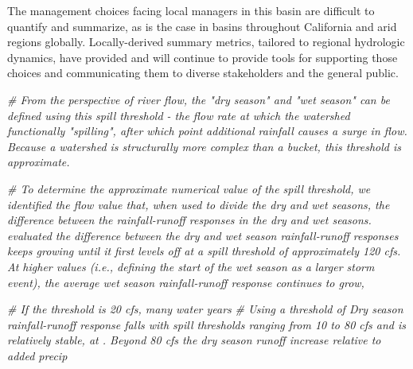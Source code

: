 \documentclass[
]{article}
\newenvironment{Shaded}{\begin{snugshade}}{\end{snugshade}}
\newcommand{\CommentTok}[1]{\textcolor[rgb]{0.56,0.35,0.01}{\textit{#1}}}
\begin{document}
The management choices facing local managers in this basin are difficult
to quantify and summarize, as is the case in basins throughout
California and arid regions globally. Locally-derived summary metrics,
tailored to regional hydrologic dynamics, have provided and will
continue to provide tools for supporting those choices and communicating
them to diverse stakeholders and the general public.

\begin{Shaded}
\begin{Highlighting}[]
\CommentTok{\# From the perspective of river flow, the "dry season" and "wet season" can be defined using this spill threshold {-} the flow rate at which the watershed functionally "spilling", after which point additional rainfall causes a surge in flow. Because a watershed is structurally more complex than a bucket, this threshold is approximate. }

\CommentTok{\# To determine the approximate numerical value of the spill threshold, we identified the flow value that, when used to divide the dry and wet seasons,   the difference between the rainfall{-}runoff responses in the dry and wet seasons. evaluated the difference between the dry and wet season rainfall{-}runoff responses keeps growing until it first levels off at a spill threshold of approximately 120 cfs. At higher values (i.e., defining the start of the wet season as a larger storm event), the average wet season rainfall{-}runoff response continues to grow, }

\CommentTok{\# If the threshold is 20 cfs, many water years }
\CommentTok{\# Using a threshold of Dry season rainfall{-}runoff response falls with spill thresholds ranging from 10 to 80 cfs and is relatively stable, at . Beyond 80 cfs the dry season runoff increase relative to added precip }


\end{Highlighting}
\end{Shaded}
\end{document}
